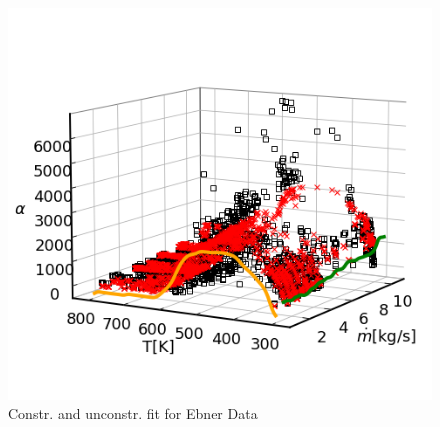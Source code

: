 \documentclass[10pt,a4paper]{article}
\begin{document}
\begin{figure}[H]
	\centering
	\includegraphics[width=\columnwidth]{../thesisplots/ebner/Model_constraint.png}
	\caption{Constr. and unconstr. fit for Ebner Data}
	\label{fig:ebner_fit_s250}
\end{figure}
\end{document}
